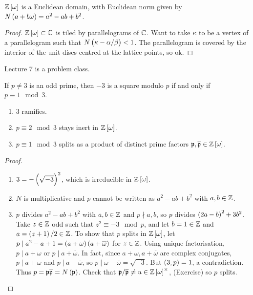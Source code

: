 \begin{theorem}
$ \Z\sbr{\omega} $ is a Euclidean domain, with Euclidean norm given by $ N\br{a + b\omega} = a^2 - ab + b^2 $.
\end{theorem}

\begin{proof}
$ \Z\sbr{\omega} \subset \C $ is tiled by parallelograms of $ \mathbb{C} $. Want to take $ \kappa $ to be a vertex of a parallelogram such that $ N\br{\kappa - \alpha / \beta} < 1 $. The parallelogram is covered by the interior of the unit discs centred at the lattice points, so ok.
\end{proof}


Lecture 7 is a problem class.


\begin{lemma}
If $ p \ne 3 $ is an odd prime, then $ -3 $ is a square modulo $ p $ if and only if $ p \equiv 1 \mod 3 $.
\end{lemma}

\pagebreak

\begin{theorem}
\hfill
\begin{enumerate}
\item $ 3 $ ramifies.
\item $ p \equiv 2 \mod 3 $ stays inert in $ \Z\sbr{\omega} $.
\item $ p \equiv 1 \mod 3 $ splits as a product of distinct prime factors $ \pp, \overline{\pp} \in \Z\sbr{\omega} $.
\end{enumerate}
\end{theorem}

\begin{proof}
\hfill
\begin{enumerate}
\item $ 3 = -\br{\sqrt{-3}}^2 $, which is irreducible in $ \Z\sbr{\omega} $.
\item $ N $ is multiplicative and $ p $ cannot be written as $ a^2 - ab + b^2 $ with $ a, b \in \mathbb{Z} $.
\item $ p $ divides $ a^2 - ab + b^2 $ with $ a, b \in \mathbb{Z} $ and $ p \nmid a, b $, so $ p $ divides $ \br{2a - b}^2 + 3b^2 $. Take $ z \in \mathbb{Z} $ odd such that $ z^2 \equiv -3 \mod p $, and let $ b = 1 \in \mathbb{Z} $ and $ a = \br{z + 1} / 2 \in \Z $. To show that $ p $ splits in $ \Z\sbr{\omega} $, let $ p \mid a^2 - a + 1 = \br{a + \omega}\br{a + \overline{\omega}} $ for $ z \in \mathbb{Z} $. Using unique factorisation, $ p \mid a + \omega $ or $ p \mid a + \overline{\omega} $. In fact, since $ a + \omega, a + \overline{\omega} $ are complex conjugates, $ p \mid a + \omega $ and $ p \mid a + \overline{\omega} $, so $ p \mid \omega - \overline{\omega} = \sqrt{-3} $. But $ \br{3, p} = 1 $, a contradiction. Thus $ p = \pp\overline{\pp} = N\br{\pp} $. Check that $ \pp / \overline{\pp} \ne u \in \Z\sbr{\omega}^\times $, (Exercise) so $ p $ splits.
\end{enumerate}
\end{proof}

